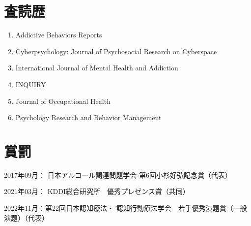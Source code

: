\documentclass[11pt,a4paper]{article}
\begin{document}
\section{査読歴}
	\begin{enumerate}
	\item Addictive Behaviors Reports
	\item Cyberpsychology: Journal of Psychosocial Research on Cyberspace 
	\item International Journal of Mental Health and Addiction
	\item INQUIRY
	\item Journal of Occupational Health
	\item Psychology Research and Behavior Management 
\end{enumerate}
\section{賞罰}
\begin{description}
	\item 2017年09月： 日本アルコール関連問題学会 第6回小杉好弘記念賞（代表）
	\item 2021年03月： KDDI総合研究所　優秀プレゼンス賞（共同）
	\item 2022年11月：第22回日本認知療法・	認知行動療法学会　若手優秀演題賞（一般演題）（代表）
\end{description}
\end{document}
